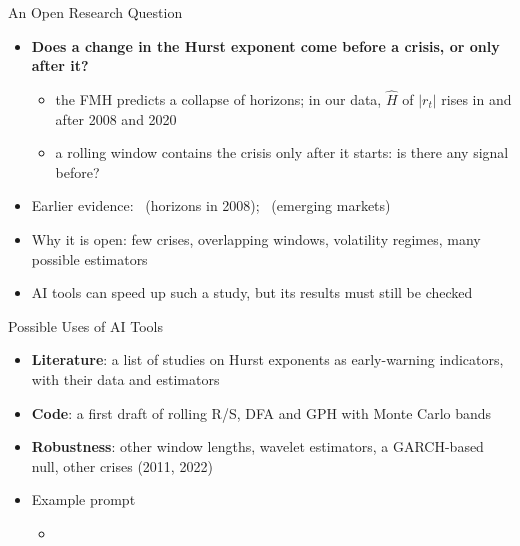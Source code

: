 \begin{frame}{An Open Research Question}
\itemsize{\small}
\begin{itemize}
    \item \textbf{Does a change in the Hurst exponent come before a crisis, or only after it?}
    \begin{itemize}
        \item the FMH predicts a collapse of horizons; in our data, $\hat H$ of $|r_t|$ rises in and after 2008 and 2020
        \item a rolling window contains the crisis only after it starts: is there any signal before?
    \end{itemize}
    \item Earlier evidence: \ (horizons in 2008); \ (emerging markets)
    \item Why it is open: few crises, overlapping windows, volatility regimes, many possible estimators
    \item AI tools can speed up such a study, but its results must still be checked 
\end{itemize}
\end{frame}

\begin{frame}{Possible Uses of AI Tools}
\itemsize{\small}
\begin{itemize}
    \item \textbf{Literature}: a list of studies on Hurst exponents as early-warning indicators, with their data and estimators
    \item \textbf{Code}: a first draft of rolling R/S, DFA and GPH with Monte Carlo bands
    \item \textbf{Robustness}: other window lengths, wavelet estimators, a GARCH-based null, other crises (2011, 2022)
    \item Example prompt
    \begin{itemize}
        \item {}
    \end{itemize}
\end{itemize}
\end{frame}

